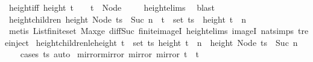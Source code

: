 \begin{isabellebody}
\ height{\isacharunderscore}{\kern0pt}{}{\isacharunderscore}{\kern0pt}iff{\isacharcolon}{\kern0pt}\ {\isachardoublequoteopen}height\ t\ {\isacharequal}{\kern0pt}\ {}\ {\isasymLongrightarrow}\ t\ {\isacharequal}{\kern0pt}\ Node\ {\isacharbrackleft}{\kern0pt}{\isacharbrackright}{\kern0pt}{\isachardoublequoteclose}\isanewline
%
\isadelimproof
\ \ %
\endisadelimproof
%
\isatagproof
{}\isamarkupfalse%
\ height{\isachardot}{\kern0pt}elims\ \isamarkupfalse%
\ blast%
\endisatagproof
{\isafoldproof}%
%
\isadelimproof
\isanewline
%
\endisadelimproof
\isanewline
{}\isamarkupfalse%
\ height{\isacharunderscore}{\kern0pt}children{\isacharcolon}{\kern0pt}\ {\isachardoublequoteopen}height\ {\isacharparenleft}{\kern0pt}Node\ ts{\isacharparenright}{\kern0pt}\ {\isacharequal}{\kern0pt}\ Suc\ n\ {\isasymLongrightarrow}\ t\ {\isasymin}\ set\ ts\ {\isasymLongrightarrow}\ height\ t\ {\isasymle}\ n{\isachardoublequoteclose}\isanewline
%
\isadelimproof
\ \ %
\endisadelimproof
%
\isatagproof
{}\isamarkupfalse%
\ {\isacharparenleft}{\kern0pt}metis\ List{\isachardot}{\kern0pt}finite{\isacharunderscore}{\kern0pt}set\ Max{\isacharunderscore}{\kern0pt}ge\ diff{\isacharunderscore}{\kern0pt}Suc{\isacharunderscore}{\kern0pt}{}\ finite{\isacharunderscore}{\kern0pt}imageI\ height{\isachardot}{\kern0pt}elims\ imageI\ nat{\isachardot}{\kern0pt}simps{\isacharparenleft}{\kern0pt}{}{\isacharparenright}{\kern0pt}\ tree{\isachardot}{\kern0pt}inject{\isacharparenright}{\kern0pt}%
\endisatagproof
{\isafoldproof}%
%
\isadelimproof
\isanewline
%
\endisadelimproof
\isanewline
{}\isamarkupfalse%
\ height{\isacharunderscore}{\kern0pt}children{\isacharunderscore}{\kern0pt}le{\isacharunderscore}{\kern0pt}height{\isacharcolon}{\kern0pt}\ {\isachardoublequoteopen}{\isasymforall}t\ {\isasymin}\ set\ ts{\isachardot}{\kern0pt}\ height\ t\ {\isasymle}\ n\ {\isasymLongrightarrow}\ height\ {\isacharparenleft}{\kern0pt}Node\ ts{\isacharparenright}{\kern0pt}\ {\isasymle}\ Suc\ n{\isachardoublequoteclose}\isanewline
%
\isadelimproof
\ \ %
\endisadelimproof
%
\isatagproof
{}\isamarkupfalse%
\ {\isacharparenleft}{\kern0pt}cases\ ts{\isacharparenright}{\kern0pt}\ auto%
\endisatagproof
{\isafoldproof}%
%
\isadelimproof
\isanewline
%
\endisadelimproof
\isanewline
\isanewline
{}\isamarkupfalse%
\ mirror{\isacharunderscore}{\kern0pt}mirror{\isacharcolon}{\kern0pt}\ {\isachardoublequoteopen}mirror\ {\isacharparenleft}{\kern0pt}mirror\ t{\isacharparenright}{\kern0pt}\ {\isacharequal}{\kern0pt}\ t{\isachardoublequoteclose}\isanewline

\end{isabellebody}
